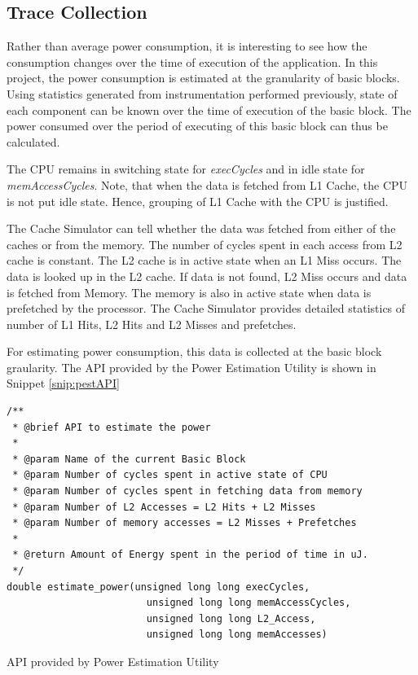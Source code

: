 \subsection{Trace Collection}
Rather than average power consumption, it is interesting to see how the consumption changes over the time of execution of the application. In this project, the power consumption is estimated at the granularity of basic blocks. Using statistics generated from instrumentation performed previously, state of each component can be known over the time of execution of the basic block. The power consumed over the period of executing of this basic block can thus be calculated.

The CPU remains in switching state for \emph{execCycles} and in idle state for \emph{memAccessCycles}. Note, that when the data is fetched from L1 Cache, the CPU is not put idle state. Hence, grouping of L1 Cache with the CPU is justified. 

The Cache Simulator can tell whether the data was fetched from either of the caches or from the memory. The number of cycles spent in each access from L2 cache is constant. The L2 cache is in active state when an L1 Miss occurs. The data is looked up in the L2 cache. If data is not found, L2 Miss occurs and data is fetched from Memory. The memory is also in active state when data is prefetched by the processor. The Cache Simulator provides detailed statistics of number of L1 Hits, L2 Hits and L2 Misses and prefetches.

For estimating power consumption, this data is collected at the basic block graularity. The API provided by the Power Estimation Utility is shown in Snippet \ref{snip:pestAPI}

\vspace*{10pt}
\begin{Snippet}[h]
\begin{lstlisting}[numbers=none]
/**
 * @brief API to estimate the power
 *
 * @param Name of the current Basic Block
 * @param Number of cycles spent in active state of CPU
 * @param Number of cycles spent in fetching data from memory
 * @param Number of L2 Accesses = L2 Hits + L2 Misses
 * @param Number of memory accesses = L2 Misses + Prefetches
 *
 * @return Amount of Energy spent in the period of time in uJ.
 */
double estimate_power(unsigned long long execCycles,
                		unsigned long long memAccessCycles,
                		unsigned long long L2_Access,
                		unsigned long long memAccesses)
\end{lstlisting}
\caption{API provided by Power Estimation Utility}
\label{snip:pestAPI}
\end{Snippet}

